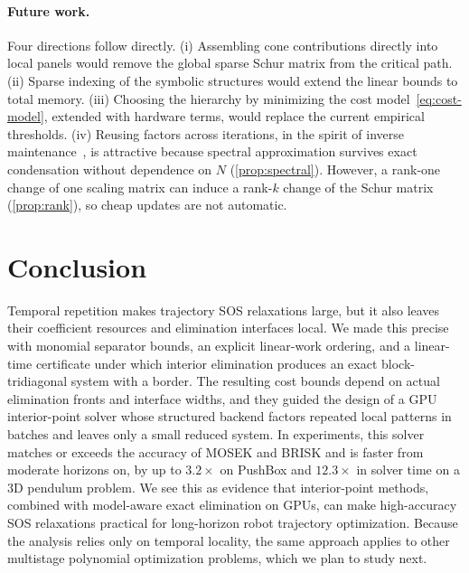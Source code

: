 \paragraph{Future work.}
Four directions follow directly. (i) Assembling cone contributions directly into
local panels would remove the global sparse Schur matrix from the critical path.
(ii) Sparse indexing of the symbolic structures would extend the linear bounds
to total memory. (iii) Choosing the hierarchy by minimizing the cost
model~\eqref{eq:cost-model}, extended with hardware terms, would replace the
current empirical thresholds. (iv) Reusing factors across iterations, in the
spirit of inverse maintenance~\cite{jiang2022sos}, is attractive because spectral
approximation survives exact condensation without dependence on $N$
(\cref{prop:spectral}). However, a rank-one change of one scaling matrix can
induce a rank-$k$ change of the Schur matrix (\cref{prop:rank}), so cheap
updates are not automatic.

\section{Conclusion}\label{sec:conclusion}

Temporal repetition makes trajectory SOS relaxations large, but it also leaves
their coefficient resources and elimination interfaces local. We made this
precise with monomial separator bounds, an explicit linear-work ordering, and a
linear-time certificate under which interior elimination produces an exact
block-tridiagonal system with a border. The resulting cost bounds depend on
actual elimination fronts and interface widths, and they guided the design of a
GPU interior-point solver whose structured backend factors repeated local
patterns in batches and leaves only a small reduced system. In experiments, this
solver matches or exceeds the accuracy of MOSEK and BRISK and is faster from
moderate horizons on, by up to $3.2\times$ on PushBox and $12.3\times$ in solver
time on a 3D pendulum problem. We see this as evidence that interior-point
methods, combined with model-aware exact elimination on GPUs, can make
high-accuracy SOS relaxations practical for long-horizon robot trajectory
optimization. Because the analysis relies only on temporal locality, the same
approach applies to other multistage polynomial optimization problems, which we
plan to study next.
